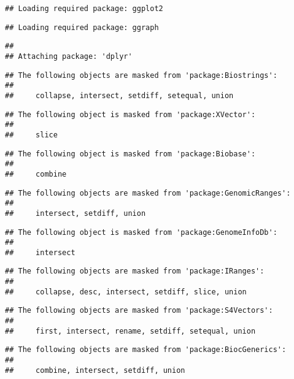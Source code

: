 \documentclass[
  oneside]{book}
\begin{document}
\begin{verbatim}
## Loading required package: ggplot2
\end{verbatim}

\begin{verbatim}
## Loading required package: ggraph
\end{verbatim}

\begin{verbatim}
## 
## Attaching package: 'dplyr'
\end{verbatim}

\begin{verbatim}
## The following objects are masked from 'package:Biostrings':
## 
##     collapse, intersect, setdiff, setequal, union
\end{verbatim}

\begin{verbatim}
## The following object is masked from 'package:XVector':
## 
##     slice
\end{verbatim}

\begin{verbatim}
## The following object is masked from 'package:Biobase':
## 
##     combine
\end{verbatim}

\begin{verbatim}
## The following objects are masked from 'package:GenomicRanges':
## 
##     intersect, setdiff, union
\end{verbatim}

\begin{verbatim}
## The following object is masked from 'package:GenomeInfoDb':
## 
##     intersect
\end{verbatim}

\begin{verbatim}
## The following objects are masked from 'package:IRanges':
## 
##     collapse, desc, intersect, setdiff, slice, union
\end{verbatim}

\begin{verbatim}
## The following objects are masked from 'package:S4Vectors':
## 
##     first, intersect, rename, setdiff, setequal, union
\end{verbatim}

\begin{verbatim}
## The following objects are masked from 'package:BiocGenerics':
## 
##     combine, intersect, setdiff, union
\end{verbatim}
\end{document}
